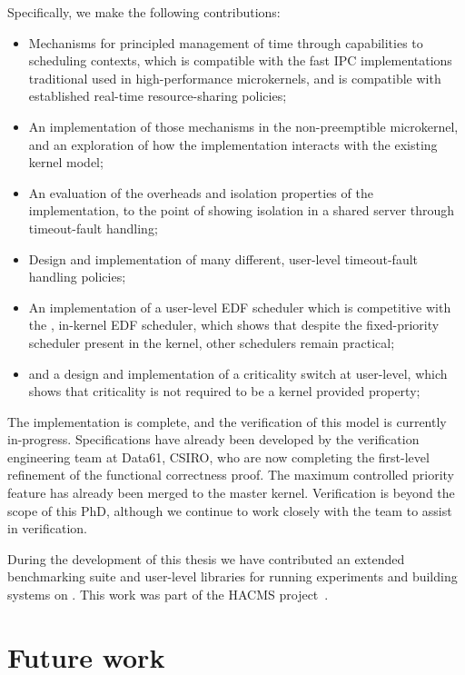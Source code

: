 Specifically, we make the following contributions:

\begin{itemize}
    \item Mechanisms for principled management of time through capabilities to scheduling contexts,
        which is compatible with the fast IPC implementations traditional used in high-performance
        microkernels, and is compatible with established real-time resource-sharing policies;
    \item An implementation of those mechanisms in the non-preemptible \selfour microkernel, and an
        exploration of how the implementation interacts with the existing kernel model;
    \item An evaluation of the overheads and isolation properties of the implementation, to the
        point of showing isolation in a shared server through timeout-fault handling;
    \item Design and implementation of many different, user-level timeout-fault handling policies;
    \item An implementation of a user-level \gls{EDF} scheduler which is competitive with the
        \litmus, in-kernel EDF scheduler, which shows that despite the fixed-priority scheduler
        present in the kernel, other schedulers remain practical;
    \item and a design and implementation of a criticality switch at user-level, which shows that
        criticality is not required to be a kernel provided property;
\end{itemize}

The implementation is complete, and the verification of this model is currently in-progress.
Specifications have already been developed by the verification engineering team at Data61, CSIRO,
who are now completing the first-level refinement of the functional correctness proof.
The maximum controlled priority feature has already been merged to the master kernel. 
Verification is beyond the scope of this PhD, although we continue to work closely with
the team to assist in verification. 

During the development of this thesis we have contributed an extended benchmarking suite and
user-level libraries for running experiments and building systems on \selfour. This work was part of
the HACMS project~\citep{Klein_AKMHF_toappear}.

\section{Future work}


